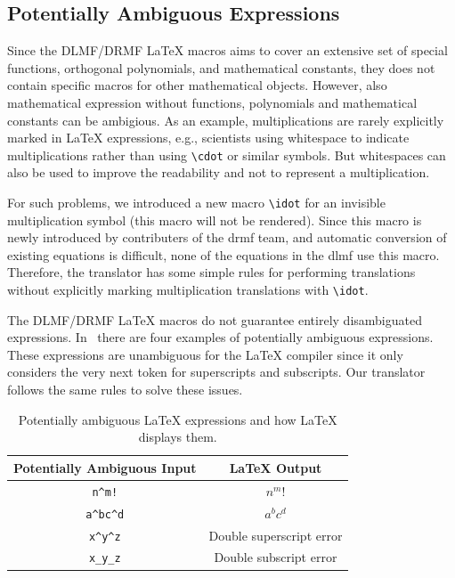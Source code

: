 \documentclass[a4paper,11pt]{article}
\newcommand{\DLMF}{DLMF}
\newcommand{\DRMF}{DRMF}
\newcommand{\Macro}{\DLMF/\DRMF{} \LaTeX{} macro}
\theoremstyle{defTheoStyle}
\theoremstyle{defExampStyle}
\begin{document}
\subsection{Potentially Ambiguous Expressions}
Since the \Macro s aims to cover an extensive set of special functions, orthogonal polynomials, and mathematical constants, they does not contain specific macros for other mathematical objects. However, also mathematical expression without functions, polynomials and mathematical constants can be ambigious. As an example, multiplications are rarely explicitly marked in \LaTeX{} expressions, e.g., scientists using whitespace to indicate multiplications rather than using \verb|\cdot| or similar symbols. But whitespaces can also be used to improve the readability and not to represent a multiplication.

For such problems, we introduced a new macro \verb|\idot| for an invisible multiplication symbol (this macro will not be rendered). Since this macro is newly introduced by contributers of the \gls*{drmf} team, and automatic conversion of existing equations is difficult, none of the equations in the \gls*{dlmf} use this macro. Therefore, the translator has some simple 
rules for performing translations without explicitly marking multiplication translations with \verb|\idot|.

The \Macro s do not guarantee entirely disambiguated expressions. In~ there are four examples of potentially ambiguous expressions. These expressions are unambiguous for the \LaTeX{} compiler since it only considers the very next token for superscripts and subscripts. Our translator follows the same rules to solve these issues.

\begin{table}[ht]
\centering
\begin{tabular}{cc}
	\hline
	Potentially Ambiguous Input & \LaTeX{} Output\\
	\hline
	\verb|n^m!| & $n^m!$\\
	\verb|a^bc^d| & $a^bc^d$\\
	\verb|x^y^z| & Double superscript error\\
	\verb|x_y_z| & Double subscript error\\
	\hline
\end{tabular}
\caption{Potentially ambiguous \LaTeX{} expressions and how \LaTeX{} displays them.}
\label{tab:amb-latex}
\end{table}
\end{document}
